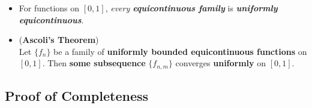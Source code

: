 \documentclass[11pt]{article}
\begin{document}
\begin{itemize}
\item \begin{remark}
For functions on $[0, 1]$, \emph{every \textbf{equicontinuous family}} is \emph{\textbf{uniformly equicontinuous}}.
\end{remark}

\item \begin{theorem} (\textbf{Ascoli's Theorem}) \citep{reed1980methods}\\
Let $\{f_n\}$ be a family of \textbf{uniformly bounded equicontinuous functions} on $[0, 1]$. Then \textbf{some subsequence} $\{f_{n,m}\}$ converges \textbf{uniformly} on $[0, 1]$.
\end{theorem}
\end{itemize}

\subsection{Proof of Completeness}
\end{document}
